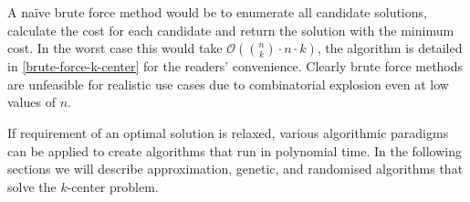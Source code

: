 A na\"ive brute force method would be to enumerate all candidate solutions, calculate the cost for each candidate and return the solution with the minimum cost. In the worst case this would take $\mathcal{O}(\binom{n}{k}\cdot n\cdot k)$, the algorithm is detailed in \cref{brute-force-k-center} for the readers' convenience. Clearly brute force methods are unfeasible for realistic use cases due to combinatorial explosion even at low values of $n$. 

If requirement of an optimal solution is relaxed, various algorithmic paradigms can be applied to create algorithms that run in polynomial time. In the following sections we will describe approximation, genetic, and randomised algorithms that solve the $k$-center problem.